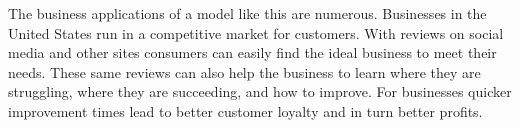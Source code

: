 \documentclass[titlepage,letterpaper]{article}
\begin{document}
The business applications of a model like this are numerous. Businesses in the United States run in a competitive market for customers. With reviews on social media and other sites consumers can easily find the ideal business to meet their needs. These same reviews can also help the business to learn where they are struggling, where they are succeeding, and how to improve. For businesses quicker improvement times lead to better customer loyalty and in turn better profits.   



\clearpage 

\printbibliography
\end{document}
